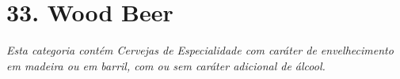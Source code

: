 \section*{33. Wood Beer}

\textit{Esta categoria contém Cervejas de Especialidade com caráter de envelhecimento em madeira ou em barril, com ou sem caráter adicional de álcool.}
